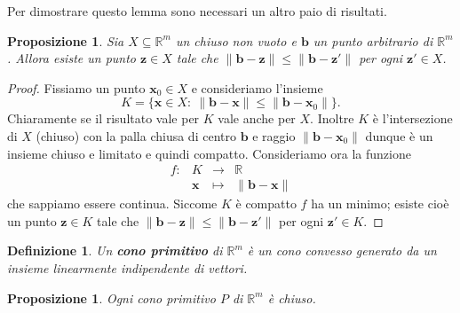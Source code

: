 \documentclass[italian, letter paper, 12pt, reqno]{article}
\theoremstyle{myteo}
\newtheorem{proposition}[theorem]{Proposizione}
\newtheorem{definition}[theorem]{Definizione}
\numberwithin{equation}{section}
\begin{document}
Per dimostrare questo lemma sono necessari un altro paio di risultati.

\begin{proposition}
  \label{prop:closed_nearest_point}
  Sia \(X\subseteq \mathbb{R}^m\) un chiuso non vuoto e \(\mathbf{b}\) un punto arbitrario di \(\mathbb{R}^m\).
  Allora esiste un punto \(\mathbf{z}\in X\) tale che \(\|\mathbf{b}-\mathbf{z}\| \le \|\mathbf{b} - \mathbf{z}'\|\) per ogni \(\mathbf{z}'\in X\).
\end{proposition}

\begin{proof}
  Fissiamo un punto \(\mathbf{x}_0\in X\) e consideriamo l'insieme
  \[K=\big\{\mathbf{x}\in X\colon\ \|\mathbf{b} - \mathbf{x}\| \le \|\mathbf{b} - \mathbf{x}_0\|\big\}.\]
  Chiaramente se il risultato vale per \(K\) vale anche per \(X\).
  Inoltre \(K\) è l'intersezione di \(X\) (chiuso) con la palla chiusa di centro \(\mathbf{b}\) e raggio \(\|\mathbf{b} - \mathbf{x}_0\|\) dunque è un insieme chiuso e limitato e quindi compatto.
  Consideriamo ora la funzione
  \begin{equation*}
    \begin{array}{crcl}
      f\colon & K & \to & \mathbb{R}\\
              & \mathbf{x} & \mapsto & \|\mathbf{b} - \mathbf{x}\|
    \end{array}
  \end{equation*}
  che sappiamo essere continua.
  Siccome \(K\) è compatto \(f\) ha un minimo; esiste cioè un punto \(\mathbf{z}\in K\) tale che \(\|\mathbf{b} - \mathbf{z}\| \le \|\mathbf{b} - \mathbf{z}'\|\) per ogni \(\mathbf{z}'\in K\).
\end{proof}

\begin{definition}
  \label{def:cono_primitivo}
  Un \textbf{cono primitivo} di \(\mathbb{R}^m\) è un cono convesso generato da un insieme \emph{linearmente indipendente} di vettori.
\end{definition}

\begin{proposition}
  \label{prop:coni_primitivi_chiusi}
  Ogni cono primitivo \(P\) di \(\mathbb{R}^m\) è chiuso.
\end{proposition}
\end{document}
